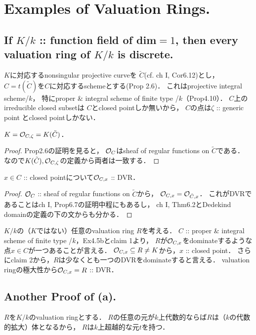 \documentclass[a4paper]{jsarticle}
\begin{document}
\section{Examples of Valuation Rings.} %
    \subsection{If $K/k$ :: function field of dim$=1$, then every valuation ring of $K/k$ is discrete.}
    $K$に対応するnonsingular projective curveを
    $\tilde{C}$(cf. ch I, Cor6.12)とし，
    $C=t(\tilde{C})$を$C$に対応するschemeとする(Prop 2.6)．
    これはprojective integral scheme/$k$，
    特にproper \& integral scheme of finite type /$k$（Prop4.10）．
    $C$上のirreducible closed subsetは
    $C$とclosed pointしか無いから，
    $C$の点は$\zeta$ :: generic point とclosed pointしかない．

    \begin{Claim}[claim 1]
        $K=\mathcal{O}_{C,\zeta}=K(\tilde{C})$．
    \end{Claim}
    \begin{proof}
        Prop2.6の証明を見ると，
        $\mathcal{O}_C$はsheaf of regular functions on $\tilde{C}$である．
        なので$K(\tilde{C}), \mathcal{O}_{C,\zeta}$の定義から両者は一致する．
    \end{proof}

    \begin{Claim}[claim 2]
        $x \in C$ :: closed pointについて$\mathcal{O}_{C,x}$ :: DVR．
    \end{Claim}
    \begin{proof}
        $\mathcal{O}_C$ :: sheaf of regular functions on $\tilde{C}$から，
        $\mathcal{O}_{C,x}=\mathcal{O}_{\tilde{C},x}$．
        これがDVRであることはch I, Prop6.7の証明中程にもあるし，
        ch I, Thm6.2とDedekind domainの定義の下の文からも分かる．
    \end{proof}

    $K/k$の（$K$ではない）任意のvaluation ring $R$を考える．
    $C$ :: proper \& integral scheme of finite type /$k$，Ex4.5bとclaim 1より，
    $R$が$\mathcal{O}_{C,x}$をdominateするような点$x \in C$が一つあることが言える．
    $\mathcal{O}_{C,x} \subseteq R \neq K$から，$x$ :: closed point．
    さらにclaim 2から，$R$は少なくとも一つのDVRをdominateすると言える．
    valuation ringの極大性から$\mathcal{O}_{C,x}=R$ :: DVR．

    \subsection*{Another Proof of (a).}
    $R$を$K/k$のvaluation ringとする．
    $R$の任意の元が$k$上代数的ならば$R$は（$k$の代数的拡大）体となるから，
    $R$は$k$上超越的な元$t$を持つ．
\end{document}

